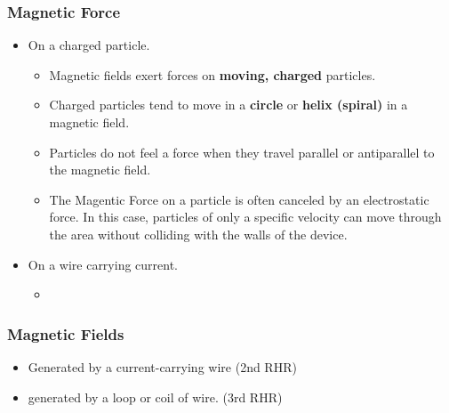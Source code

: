 \documentclass[letterpaper, 12pt]{article}
\begin{document}
\subsubsection*{Magnetic Force}
\begin{itemize}
	\item On a charged particle.
		\begin{itemize}
			\item Magnetic fields exert forces on \textbf{moving, charged} particles.
			\item Charged particles tend to move in a \textbf{circle} or \textbf{helix (spiral)} in a magnetic field.
			\item Particles do not feel a force when they travel parallel or antiparallel to the magnetic field. 
			\item The Magentic Force on a particle is often canceled by an electrostatic force.  In this case, particles of only a specific velocity can move through the area without colliding with the walls of the device.
			
		\end{itemize}
	\item On a wire carrying current.
		\begin{itemize}
			\item 
		\end{itemize}
	
\end{itemize}
\subsubsection*{Magnetic Fields}
\begin{itemize}
	\item Generated by a current-carrying wire (2nd RHR)
	\item generated by a loop or coil of wire. (3rd RHR)
\end{itemize}
\end{document}
